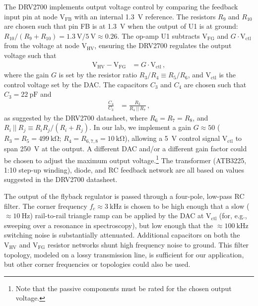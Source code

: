 \documentclass[aip,rsi,reprint]{revtex4-1} %
\begin{document}
The DRV2700 implements output voltage control by comparing the feedback input pin at node $\text{V}_\text{FB}$ with an internal \SI{1.3}{\volt} reference.
The resistors $R_9$ and $R_{10}$ are chosen such that pin FB is at \SI{1.3}{\volt} when the output of U1 is at ground: $R_{10}/(R_9+R_{10}) = \SI{1.3}{\volt}/\SI{5}{\volt} \approx \num{0.26}$.
The op-amp U1 subtracts $\text{V}_\text{FG}$ and $G\cdot \text{V}_\text{ctl}$ from the voltage at node $\text{V}_\text{HV}$, ensuring the DRV2700 regulates the output voltage such that
\begin{align}
\label{Eq:U1Output}
\text{V}_\text{HV} - \text{V}_{\text{FG}} &= G\cdot \text{V}_{\text{ctl}}\,,
\end{align}
where the gain $G$ is set by the resistor ratio $R_3/R_4 \equiv R_5/R_6$, and $\text{V}_\text{ctl}$ is the control voltage set by the DAC.
The capacitors $C_3$ and $C_4$ are chosen such that $C_3 = \SI{22}{\pico\farad}$ and
\begin{align}
\frac{C_4}{C_3} &= \frac{R_3}{R_4~||~R_7}\,,
\end{align}
as suggested by the DRV2700 datasheet\cite{DRV2700Datasheet}, where $R_6 = R_7 = R_8$, and $R_i~||~R_j \equiv R_i R_j/(R_i + R_j)$.
In our lab, we implement a gain $G\approx 50$ ($R_3 = R_5 = \SI{499}{\kilo\ohm}$; $R_4 = R_{6,7,8} = \SI{10}{\kilo\ohm}$), allowing a \SI{5}{\volt} control signal $\text{V}_\text{ctl}$ to span \SI{250}{\volt} at the output. 
A different DAC and/or a different gain factor could be chosen to adjust the maximum output voltage.\footnote{Note that the passive components must be rated for the chosen output voltage.}
The transformer (ATB3225, 1:10 step-up winding), diode, and RC feedback network are all based on values suggested in the DRV2700 datasheet.\cite{DRV2700Datasheet,DRV2700EVMUserGuide}

The output of the flyback regulator is passed through a four-pole, low-pass RC filter.
The corner frequency $f_c \approx \SI{3}{\kilo\hertz}$ is chosen to be high enough that a slow ($\approx \SI{10}{\hertz}$) rail-to-rail triangle ramp can be applied by the DAC at $\text{V}_\text{ctl}$ (for, e.g., sweeping over a resonance in spectroscopy), but low enough that the $\approx \SI{100}{\kilo\hertz}$ switching noise is substantially attenuated.
Additional capacitors on both the $\text{V}_\text{HV}$ and $\text{V}_\text{FG}$ resistor networks shunt high frequency noise to ground.
This filter topology, modeled on a lossy transmission line, is sufficient for our application, but other corner frequencies or topologies could also be used.
\end{document}
